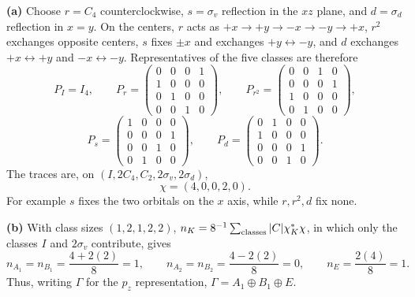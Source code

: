 \textbf{(a)} Choose $r=C_4$ counterclockwise, $s=\sigma_v$
reflection in the $xz$ plane, and $d=\sigma_d$ reflection in $x=y$.
On the centers, $r$ acts as $+x\to+y\to-x\to-y\to+x$, $r^2$
exchanges opposite centers, $s$ fixes $\pm x$ and exchanges
$+y\leftrightarrow-y$, and $d$ exchanges $+x\leftrightarrow+y$ and
$-x\leftrightarrow-y$. Representatives of the five classes are
therefore
\[
P_I=I_4,\qquad
P_r=\begin{pmatrix}0&0&0&1\\1&0&0&0\\0&1&0&0\\0&0&1&0\end{pmatrix},
\qquad
P_{r^2}=\begin{pmatrix}0&0&1&0\\0&0&0&1\\1&0&0&0\\0&1&0&0\end{pmatrix},
\]
\[
P_s=\begin{pmatrix}1&0&0&0\\0&0&0&1\\0&0&1&0\\0&1&0&0\end{pmatrix},
\qquad
P_d=\begin{pmatrix}0&1&0&0\\1&0&0&0\\0&0&0&1\\0&0&1&0\end{pmatrix}.
\]
The traces are, on $(I,2C_4,C_2,2\sigma_v,2\sigma_d)$,
\[
\boxed{\chi=(4,0,0,2,0)}.
\]
For example $s$ fixes the two orbitals on the $x$ axis,
while $r,r^2,d$ fix none.

\textbf{(b)} With class sizes $(1,2,1,2,2)$,
$n_K=8^{-1}\sum_{\rm classes}|C|\chi_K^*\chi$, in which only the
classes $I$ and $2\sigma_v$ contribute, gives
\[
n_{A_1}=n_{B_1}=\frac{4+2(2)}8=1,\qquad
n_{A_2}=n_{B_2}=\frac{4-2(2)}8=0,\qquad
n_E=\frac{2(4)}8=1.
\]
Thus, writing $\Gamma$ for the $p_z$ representation,
\(\boxed{\Gamma=A_1\oplus B_1\oplus E}\).

